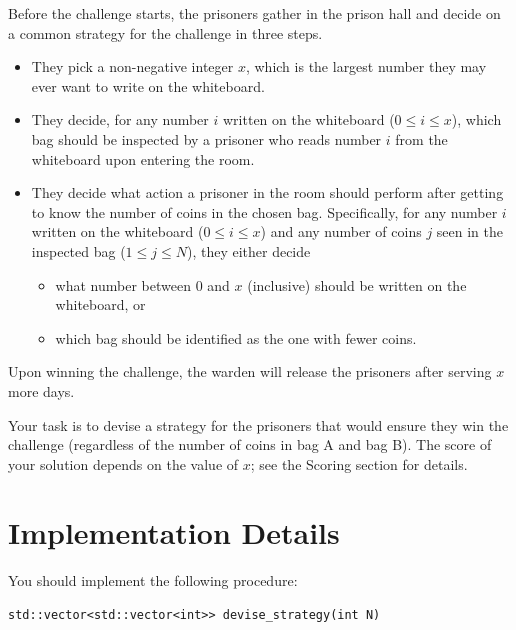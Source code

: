 Before the challenge starts, the prisoners gather in the prison hall and decide on a common strategy
for the challenge in three steps.
\begin{itemize}
  \item They pick a non-negative integer $x$, which is the largest number they may ever want to write
  on the whiteboard.
  \item They decide, for any number $i$ written on the whiteboard ($0 \leq i \leq x$), which bag should
  be inspected by a prisoner who reads number $i$ from the whiteboard upon entering the room.
  \item They decide what action a prisoner in the room should perform after getting to know the number
  of coins in the chosen bag. Specifically, for any number $i$ written on the whiteboard
  ($0 \leq i \leq x$) and any number of coins $j$ seen in the inspected bag ($1 \leq j \leq N$), they
  either decide
  \begin{itemize}
    \item what number between $0$ and $x$ (inclusive) should be written on the whiteboard, or
    \item which bag should be identified as the one with fewer coins.
  \end{itemize}
\end{itemize}

Upon winning the challenge, the warden will release the prisoners after serving $x$ more days.

Your task is to devise a strategy for the prisoners that would ensure they win the challenge
(regardless of the number of coins in bag A and bag B). The score of your solution depends on the
value of $x$; see the Scoring section for details.

\section*{Implementation Details}
You should implement the following procedure:

\begin{verbatim}
std::vector<std::vector<int>> devise_strategy(int N)
\end{verbatim}

